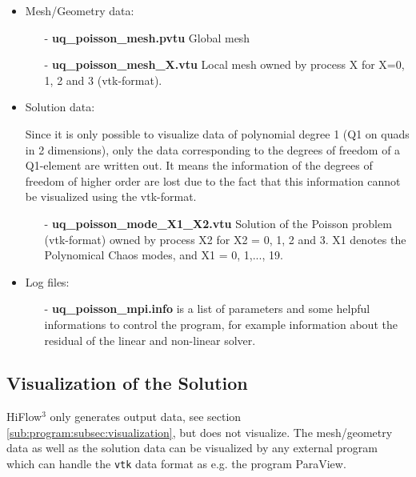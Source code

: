 \documentclass{article}
\begin{document}
\begin{itemize}
 \item Mesh/Geometry data:
\begin{itemize}
      \item[-] \textbf{uq\_poisson\_mesh.pvtu} Global mesh
      \item[-] \textbf{uq\_poisson\_mesh\_X.vtu} Local mesh owned by process X for X=0, 1, 2 and 3 (vtk-format).
\end{itemize}
\item[]
\item Solution data:

\item[]Since it is only possible to visualize data of polynomial degree 1 (Q1 on quads
in 2 dimensions), only the data corresponding to the degrees of freedom of a Q1-element
are written out. It means the information of the degrees of freedom of higher order are lost
due to the fact that this information cannot be visualized using the vtk-format.

\begin{itemize}
      \item[-] \textbf{uq\_poisson\_mode\_X1\_X2.vtu} Solution of the Poisson problem (vtk-format) owned by process X2 for X2 = 0, 1, 2 and 3. X1 denotes the Polynomical Chaos modes, and X1 = 0, 1,..., 19.
\end{itemize}

\item Log files:
\begin{itemize}
      \item[-] \textbf{uq\_poisson\_mpi.info} is a list of parameters and some helpful informations to control
the program, for example information about the residual of the linear and non-linear solver.
\end{itemize}

\end{itemize}


\subsection{Visualization of the Solution}

HiFlow$^\text{3}$ only generates output data, see section \ref{sub:program:subsec:visualization}, but does not visualize. The mesh/geometry
data as well as the solution data can be visualized by any external program which can handle the
\texttt{vtk} data format as e.g. the program ParaView\cite{ParaView}.
\end{document}
